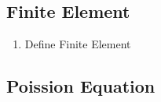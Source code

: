 \subsection{Finite Element}%
\label{sub:finite_element}

\begin{enumerate}[label=\arabic*)]
    \item Define Finite Element

\end{enumerate}

\subsection{Poission Equation}%
\label{sub:poission_equation}















